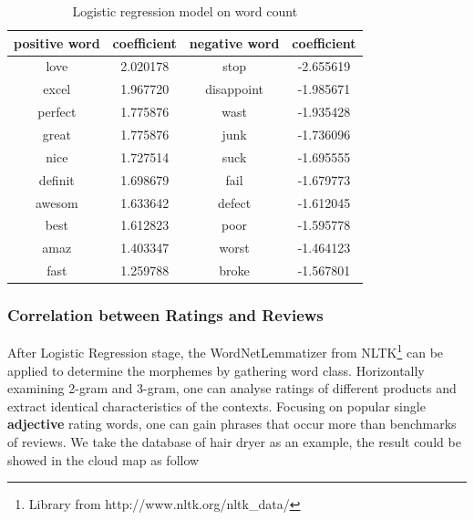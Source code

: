 \documentclass[12pt]{article}%
\begin{document}
\begin{table}[H]
	\centering
	\caption{Logistic regression model on word count}	
	\begin{tabular}{cccc}
		\toprule[1.5pt]
		\multicolumn{1}{m{3cm}}{\centering positive word} & \multicolumn{1}{m{3cm}}{\centering coefficient}&
		\multicolumn{1}{m{3cm}}{\centering negative word}&
		\multicolumn{1}{m{3cm}}{\centering coefficient} \\
		\midrule[1pt]
		love     	 & 2.020178 & stop   &-2.655619\\
		excel     & 1.967720 &disappoint    &-1.985671\\
		perfect     &1.775876&wast    &-1.935428\\
		great          &1.775876&junk        &-1.736096\\
		 nice     &1.727514& suck    &-1.695555\\
		definit          & 1.698679& fail    &-1.679773\\
		awesom          &1.633642&defect        &-1.612045\\
		best        &1.612823&poor      &-1.595778\\
amaz        &1.403347&worst       &-1.464123\\
fast       &1.259788&broke          &-1.567801\\
		\bottomrule[1.6pt]
	\end{tabular}\label{biasso}
\end{table}

\subsubsection{Correlation between Ratings and Reviews}


After Logistic Regression stage, the WordNetLemmatizer from NLTK\footnote{\quad Library from http://www.nltk.org/nltk\_data/} can be applied to determine the morphemes by gathering word class. Horizontally examining 2-gram and 3-gram, one can analyse ratings of different products and extract identical characteristics of the contexts. Focusing on popular single \textbf{adjective} rating words, one can gain phrases that occur more than benchmarks of reviews. We take the database of hair dryer as an example, the result could be showed in the cloud map as follow
\end{document}
